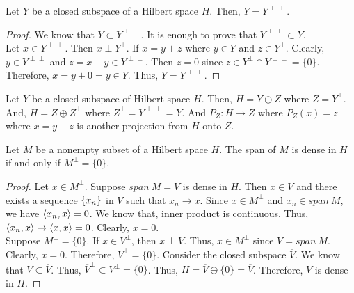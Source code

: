 \begin{lemma}
	Let $Y$ be a closed subspace of a Hilbert space $H$.
	Then, $Y = Y^{\perp\perp}$.
\end{lemma}
\begin{proof}
	We know that $Y \subset Y^{\perp\perp}$.
	It is enough to prove that $Y^{\perp\perp} \subset Y$.\\
	Let $x \in Y^{\perp\perp}$.
	Then $x \perp Y^\perp$.
	If $x = y+z$ where $y \in Y$ and $z \in Y^\perp$.
	Clearly, $y \in Y^{\perp\perp}$ and $z = x-y \in Y^{\perp\perp}$.
	Then $z = 0$ since $z \in Y^\perp \cap Y^{\perp\perp} = \{ 0 \}$.
	Therefore, $x = y + 0 = y \in Y$.
	Thus, $Y = Y^{\perp\perp}$.
\end{proof}

\begin{remark}
	Let $Y$ be a closed subspace of Hilbert space $H$.
	Then, $H = Y \oplus Z$ where $Z = Y^\perp$.
	And, $H = Z \oplus Z^\perp$ where $Z^\perp = Y^{\perp\perp} = Y$.
	And $P_Z : H \to Z$ where $P_Z(x) = z$ where $x = y+z$ is another projection from $H$ onto $Z$.
\end{remark}

\begin{lemma}[dense]
	Let $M$ be a nonempty subset of a Hilbert space $H$.
	The span of $M$ is dense in $H$ if and only if $M^\perp = \{ 0 \}$.
\end{lemma}
\begin{proof}
	Let $x \in M^\perp$.
	Suppose $span\ M = V$ is dense in $H$.
	Then $x \in V$ and there exists a sequence $\left\{x_n\right\}$ in $V$ such that $x_n \to x$.
	Since $x \in M^\perp$ and $x_n \in span\ M$, we have $\left\langle x_n,x \right\rangle = 0$.
	We know that, inner product is continuous.
	Thus, $\left\langle x_n,x \right\rangle \to \left\langle x,x \right\rangle = 0$.
	Clearly, $x = 0$.\\

	Suppose $M^\perp = \{ 0 \}$.
	If $x \in V^\perp$, then $x \perp V$.
	Thus, $x \in M^\perp$ since $V = span\ M$.
	Clearly, $x = 0$.
	Therefore, $V^\perp = \{ 0 \}$.
	Consider the closed subspace $\overline{V}$.
	We know that $V \subset \overline{V}$.
	Thus, $\overline{V}^\perp \subset V^\perp = \{ 0 \}$.
	Thus, $H = \overline{V} \oplus \{ 0 \} = \overline{V}$.
	Therefore, $V$ is dense in $H$.
\end{proof}

